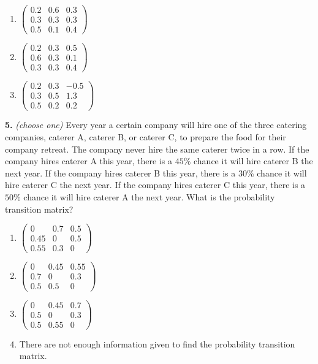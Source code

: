 \documentclass[10pt,a4paper]{article}
\begin{document}
\begin{enumerate}[label=(\Alph*)]
\item \(\begin{pmatrix}0.2&0.6&0.3\\0.3&0.3&0.3\\0.5&0.1&0.4\end{pmatrix}\)
\item \(\begin{pmatrix}0.2&0.3&0.5\\0.6&0.3&0.1\\0.3&0.3&0.4\end{pmatrix}\)
\item \(\begin{pmatrix}0.2&0.3&-0.5\\0.3&0.5&1.3\\0.5&0.2&0.2\end{pmatrix}\)
\end{enumerate}
\smallskip
\textbf{5.} \textit{(choose one)} Every year a certain company will hire one of the three catering companies, caterer A, caterer B, or caterer C, to prepare the food for their company retreat. The company never hire the same caterer twice in a row. If the company hires caterer A this year, there is a \(45\%\) chance it will hire caterer B the next year. If the company hires caterer B this year, there is a \(30\%\) chance it will hire caterer C the next year. If the company hires caterer C this year, there is a \(50\%\) chance it will hire caterer A the next year. What is the probability transition matrix?

\begin{enumerate}[label=(\Alph*)]
\item \(\begin{pmatrix}0&0.7&0.5\\0.45&0&0.5\\0.55&0.3&0\end{pmatrix}\)
\item \(\begin{pmatrix}0&0.45&0.55\\0.7&0&0.3\\0.5&0.5&0\end{pmatrix}\)
\item \(\begin{pmatrix}0&0.45&0.7\\0.5&0&0.3\\0.5&0.55&0\end{pmatrix}\)
\item There are not enough information given to find the probability transition matrix.
\end{enumerate}
\smallskip
\end{document}

